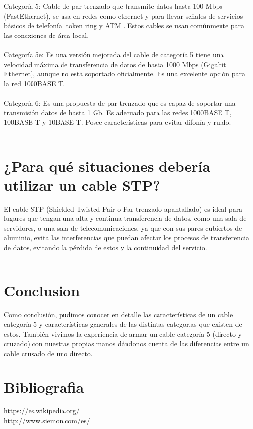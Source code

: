 \documentclass{article}
\begin{document}
Categoría 5: Cable de par trenzado que transmite datos hasta 100 Mbps (FastEthernet), se usa en redes como ethernet y para llevar señales de servicios básicos de telefonía, token ring y ATM . Estos cables se usan comúnmente para las conexiones de área local.\\\\

Categoría 5e: Es una versión mejorada del cable de categoría 5 tiene una velocidad máxima de transferencia de datos de hasta 1000 Mbps (Gigabit Ethernet), aunque no está soportado oficialmente. Es una excelente opción para la red 1000BASE T.\\\\

Categoría 6: Es una propuesta de par trenzado que es capaz de soportar una transmisión datos de hasta 1 Gb. Es adecuado para las redes 1000BASE T, 100BASE T y 10BASE T. Posee características para evitar difonía y ruido.\\\\

\section{¿Para qué situaciones debería utilizar un cable STP?}
El cable STP (Shielded Twisted Pair o Par trenzado apantallado) es ideal para lugares que tengan una alta y continua transferencia de datos, como una sala de servidores, o una sala de telecomunicaciones,  ya que con sus pares cubiertos de aluminio, evita las interferencias que puedan afectar los procesos de transferencia de datos, evitando la pérdida de estos y la continuidad del servicio. \\\\

\section{Conclusion}
Como conclusión, pudimos conocer en detalle las características de un cable categoría 5 y características generales de las distintas categorías que existen de estos. También vivimos la experiencia de armar un cable categoría 5 (directo y cruzado) con nuestras propias manos dándonos cuenta de las diferencias entre un cable cruzado de uno directo.

\section{Bibliografia}
https://es.wikipedia.org/\\
http://www.siemon.com/es/
\end{document}
